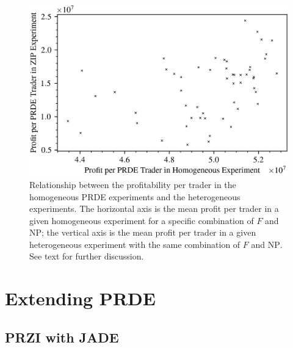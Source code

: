 \documentclass[conference]{IEEEtran}
\begin{document}
\begin{figure}[htbp]
    \centerline{\includegraphics[width=\columnwidth]{homo_zip_scatter.png}}
    \caption{
        Relationship between the profitability per trader in the homogeneous PRDE experiments and the heterogeneous experiments.
        The horizontal axis is the mean profit per trader in a given homogeneous experiment for a specific combination of $F$ and $\mathrm{NP}$; the vertical axis is the mean profit per trader in a given heterogeneous experiment with the same combination of $F$ and $\mathrm{NP}$.
        See text for further discussion.
    }
    \label{homo_zip_scatter}
\end{figure}

\section{Extending PRDE}

\subsection{PRZI with JADE}
\end{document}
